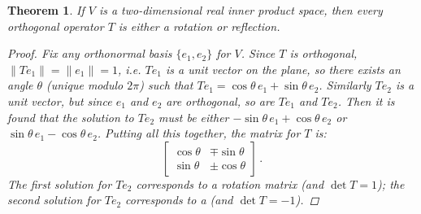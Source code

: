 \documentclass[12pt]{article}
\providecommand{\norm}[1]{\lVert#1\rVert}
\newtheorem{thm}{Theorem}
\begin{document}
\begin{thm}
If $V$ is a two-dimensional real inner product space, then every orthogonal operator $T$
is either a rotation or reflection.
\begin{proof}
Fix any orthonormal basis $\{ e_1, e_2 \}$ for $V$.
Since $T$ is orthogonal, $\norm{Te_1} = \norm{e_1} = 1$, i.e. $Te_1$ is a unit vector on the plane, so there exists an angle $\theta$ (unique modulo $2\pi$) 
such that $Te_1 = \cos \theta \, e_1 + \sin \theta \, e_2$.
Similarly $Te_2$ is a unit vector, but since $e_1$ and $e_2$ are orthogonal, so
are $Te_1$ and $Te_2$.  Then it is found that the solution to $Te_2$ must be either $-\sin \theta \,  e_1 + \cos \theta \, e_2$ or $\sin \theta \, e_1 - \cos \theta \, e_2$.  Putting all this together, the matrix for $T$ is:
\[
\begin{bmatrix}
\cos \theta & \mp\sin \theta \\
\sin \theta & \pm \cos \theta
\end{bmatrix}\,.
\]
The first solution for $Te_2$ corresponds to a rotation matrix (and $\det T = 1$);
the second solution for $Te_2$ corresponds to a 
 (and $\det T = -1$).
\end{proof}
\end{thm}

\bigskip
\end{document}
